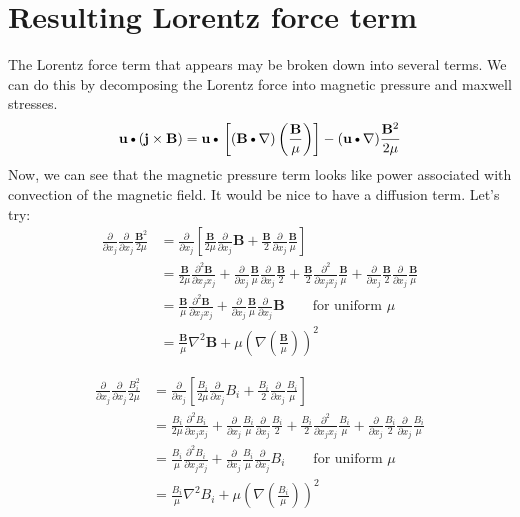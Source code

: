 \documentclass[11pt]{article}
\newcommand{\B}{\mathbf{B}}
\newcommand{\PD}{\partial}
\newcommand{\BM}{\frac{\mathbf{B}}{\mu}}
\newcommand{\J}{\mathbf{j}}
\renewcommand{\U}{\mathbf{u}}
\newcommand{\DOT}{\text{\textbullet}}
\begin{document}
\section{Resulting Lorentz force term}
The Lorentz force term that appears may be broken down into several terms. We can do this by decomposing the Lorentz force into magnetic pressure and maxwell stresses.
\begin{equation}
	\U \DOT (\J \times \B) =
	\U \DOT \left[(\B \DOT \nabla) \left( \BM \right) \right]
	- (\U \DOT \nabla) \frac{\B^2}{2\mu}
\end{equation}
Now, we can see that the magnetic pressure term looks like power associated with convection of the magnetic field. It would be nice to have a diffusion term. Let's try:
\begin{align}
	\frac{\PD}{\PD x_j} \frac{\PD}{\PD x_j} \frac{\B^2}{2 \mu}
	& =
	\frac{\PD}{\PD x_j}
	\left[
	\frac{\B}{2\mu} \frac{\PD}{\PD x_j} \B +
	\frac{\B}{2} \frac{\PD}{\PD x_j} \BM
	\right] \\
	& =
	\frac{\B}{2\mu} \frac{\PD^2 \B}{\PD x_jx_j} +
	\frac{\PD}{\PD x_j} \BM \frac{\PD}{\PD x_j} \frac{\B}{2} +
	\frac{\B}{2} \frac{\PD^2 }{\PD x_jx_j} \BM +
	\frac{\PD}{\PD x_j} \frac{\B}{2} \frac{\PD}{\PD x_j} \BM \\
	& =
	\frac{\B}{\mu} \frac{\PD^2 \B}{\PD x_jx_j} +
	\frac{\PD}{\PD x_j} \BM \frac{\PD}{\PD x_j} \B \qquad \text{for uniform $\mu$} \\
	& = \BM \nabla^2 \B + \mu \left(\nabla \left( \BM \right) \right)^2
\end{align}

\begin{align}
	\frac{\PD}{\PD x_j} \frac{\PD}{\PD x_j} \frac{B_i^2}{2 \mu}
	& =
	\frac{\PD}{\PD x_j}
	\left[
	\frac{B_i}{2\mu} \frac{\PD}{\PD x_j} B_i +
	\frac{B_i}{2} \frac{\PD}{\PD x_j} \frac{B_i}{\mu}
	\right] \\
	& =
	\frac{B_i}{2\mu} \frac{\PD^2 B_i}{\PD x_jx_j} +
	\frac{\PD}{\PD x_j} \frac{B_i}{\mu} \frac{\PD}{\PD x_j} \frac{B_i}{2} +
	\frac{B_i}{2} \frac{\PD^2 }{\PD x_jx_j} \frac{B_i}{\mu} +
	\frac{\PD}{\PD x_j} \frac{B_i}{2} \frac{\PD}{\PD x_j} \frac{B_i}{\mu} \\
	& =
	\frac{B_i}{\mu} \frac{\PD^2 B_i}{\PD x_jx_j} +
	\frac{\PD}{\PD x_j} \frac{B_i}{\mu} \frac{\PD}{\PD x_j} B_i \qquad \text{for uniform $\mu$} \\
	& = \frac{B_i}{\mu} \nabla^2 B_i + \mu \left(\nabla \left( \frac{B_i}{\mu} \right) \right)^2
\end{align}
\end{document}
